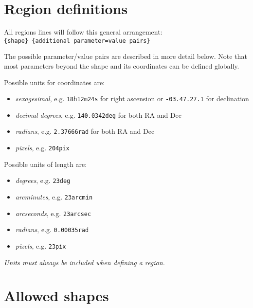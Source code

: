 \section{Region definitions}


All regions lines will follow this general arrangement:\\

{\tt \{shape\} \{additional parameter=value pairs\} }

The possible parameter/value pairs are described in more detail below.
Note that most parameters beyond the shape and its coordinates can be
defined globally.

Possible units for coordinates are:


\begin{itemize}
\item {\it sexagesimal}, e.g. {\tt 18h12m24s} for right ascension or {\tt -03.47.27.1} for declination
\item {\it decimal degrees}, e.g. {\tt 140.0342deg} for both RA and Dec
\item {\it radians}, e.g. {\tt 2.37666rad} for both RA and Dec 
\item {\it pixels}, e.g. {\tt 204pix}
\end{itemize}


Possible units of length are:


\begin{itemize}
\item {\it degrees}, e.g. {\tt 23deg}
\item {\it arcminutes}, e.g. {\tt 23arcmin}
\item {\it arcseconds}, e.g. {\tt 23arcsec}
\item {\it radians}, e.g. {\tt 0.00035rad}
\item {\it pixels}, e.g. {\tt 23pix}

\end{itemize}

{\it Units must always be included when defining a region.} 

\section{Allowed shapes}

